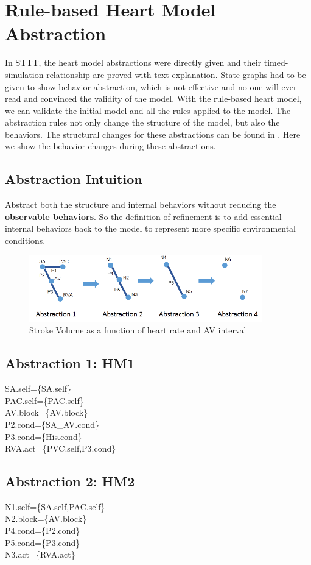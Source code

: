 \documentclass{llncs}
\begin{document}
\section{Rule-based Heart Model Abstraction}
In STTT, the heart model abstractions were directly given and their timed-simulation relationship are proved with text explanation. State graphs had to be given to show behavior abstraction, which is not effective and no-one will ever read and convinced the validity of the model. With the rule-based heart model, we can validate the initial model and all the rules applied to the model. The abstraction rules not only change the structure of the model, but also the behaviors. The structural changes for these abstractions can be found in \cite{STTT}. Here we show the behavior changes during these abstractions.
\subsection{Abstraction Intuition}
Abstract both the structure and internal behaviors without reducing the \textbf{observable behaviors}. So the definition of refinement is to add essential internal behaviors back to the model to represent more specific environmental conditions.
\begin{figure}[!t]
		\centering
		\includegraphics[width=0.9\textwidth]{figs/abs.png}
		\caption{\small Stroke Volume as a function of heart rate and AV interval}
		\label{fig:SV}
\end{figure}
\subsection{Abstraction 1: HM1}
\textsf{SA.self=\{SA.self\}\\
PAC.self=\{PAC.self\}\\
AV.block=\{AV.block\}\\
P2.cond=\{SA\_AV.cond\}\\
P3.cond=\{His.cond\}\\ 
RVA.act=\{PVC.self,P3.cond\}}
\subsection{Abstraction 2: HM2}
\textsf{N1.self=\{SA.self,PAC.self\}\\
N2.block=\{AV.block\}\\
P4.cond=\{P2.cond\}\\
P5.cond=\{P3.cond\}\\
N3.act=\{RVA.act\}}
\end{document}
